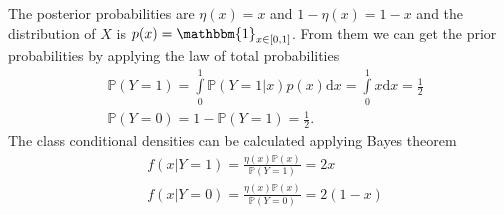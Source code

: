 \documentclass[11pt, english]{article}
\begin{document}
The posterior probabilities are $\eta(x)=x$ and $1-\eta(x)=1-x$ and the distribution of $X$ is $p(x)=\mathbbm{1}_{x\in[0,1]}$. From them we can get the prior probabilities by applying the law of total probabilities
\begin{align}
	&\mathbb{P}(Y=1)=\int\limits_0^1\mathbb{P}(Y=1|x)p(x)\text{d}x=\int\limits_0^1x\text{d}x=\frac{1}{2}\\
	&\mathbb{P}(Y=0)=1-\mathbb{P}(Y=1)=\frac{1}{2}.
\end{align}
The class conditional densities can be calculated applying Bayes theorem 
\begin{align}
	& f(x|Y=1)=\frac{\eta(x)\mathbb{P}(x)}{\mathbb{P}(Y=1)}=2x\\
	& f(x|Y=0)=\frac{\eta(x)\mathbb{P}(x)}{\mathbb{P}(Y=0)}=2(1-x)
\end{align}
 
\end{document}

